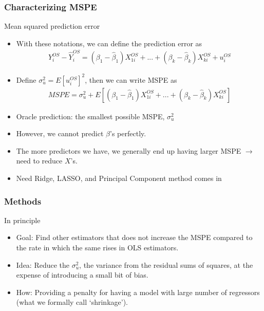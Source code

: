 \begin{frame}
\frametitle{Characterizing MSPE}
Mean squared prediction error
\begin{itemize}
\item With these notations, we can define the prediction error as
\begin{align*}
Y_{i}^{OS}-\hat{Y}_{i}^{OS}=(\beta_{1}-\hat{\beta}_{1})X^{OS}_{1i}+...+(\beta_k-\hat{\beta}_k)X^{OS}_{ki}+u_{i}^{OS}
\end{align*}
\item Define $\sigma_u^{2}=E[u_{i}^{OS}]^{2}$, then we can write MSPE as
\begin{align*}
MSPE=\sigma_u^{2}+ E[(\beta_{1}-\hat{\beta}_{1})X^{OS}_{1i}+...+(\beta_k-\hat{\beta}_k)X^{OS}_{ki}]
\end{align*}
\item Oracle prediction: the smallest possible MSPE, $\sigma_u^{2}$
\item However,  we cannot predict $\beta$'s perfectly.
\item The more predictors we have, we generally end up having larger MSPE $\to$ need to reduce $X$'s. 
\item Need Ridge, LASSO, and Principal Component method comes in
\end{itemize}
\end{frame}


\begin{frame}
\frametitle{Methods}
In principle
\begin{itemize}
\item Goal: Find other estimators that does not increase the MSPE compared to the rate in which the same rises in OLS estimators. 
\item Idea: Reduce the $\sigma_u^{2}$, the variance from the residual sums of squares, at the expense of introducing a small bit of bias. 
\item How: Providing a penalty for having a model with large number of regressors (what we formally call `shrinkage'). 
\end{itemize}
\end{frame}



